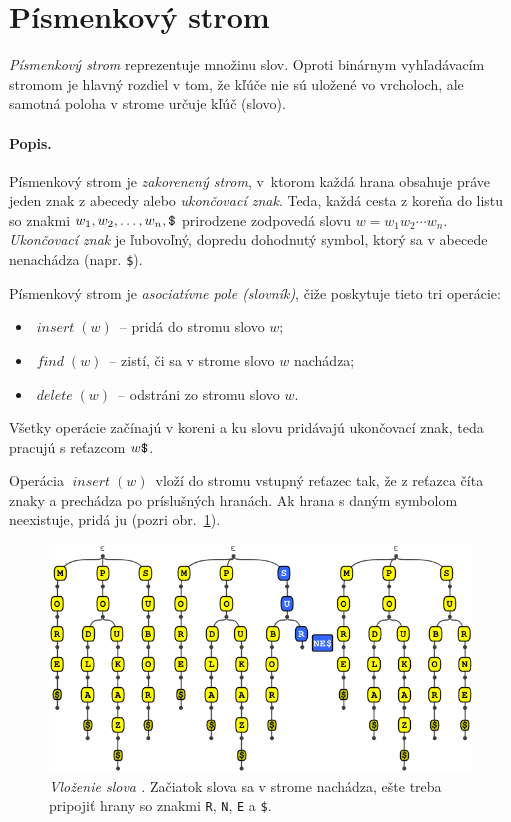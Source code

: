 
\def\k{w}
\def\put{$\mathop{\mathit{insert}}(\k)$}
\def\find{$\mathop{\mathit{find}}(\k)$}
\def\delete{$\mathop{\mathit{delete}}(\k)$}
\def\trie{trie}
\def\uz{\hbox{\tt\$}}

\section{Písmenkový strom}
\emph{Písmenkový strom} reprezentuje množinu slov. Oproti binárnym 
vyhľadávacím stromom je hlavný rozdiel v tom, že kľúče nie sú uložené 
vo vrcholoch, ale samotná poloha v strome určuje kľúč (slovo). 




\paragraph{Popis.}
Písmenkový strom je \emph{zakorenený strom}, v~ktorom každá hrana obsahuje 
práve jeden znak z abecedy alebo \emph{ukončovací znak}. Teda, každá cesta 
z koreňa do listu so znakmi $w_1, w_2, \ldots, w_n, \uz$ prirodzene 
zodpovedá slovu $w=w_1w_2\cdots w_n$. \emph{Ukončovací znak} je ľubovoľný, 
dopredu dohodnutý symbol, ktorý sa v abecede nenachádza (napr. \uz). 

Písmenkový strom je \emph{asociatívne pole (slovník)}, čiže 
poskytuje tieto tri operácie:
\begin{itemize}
\item \put\ -- pridá do stromu slovo $\k$;
\item \find\ -- zistí, či sa v strome slovo $\k$ nachádza;
\item \delete\ -- odstráni zo stromu slovo $\k$.
\end{itemize}
Všetky operácie začínajú v koreni a ku slovu pridávajú ukončovací znak, 
teda pracujú s reťazcom $\k\uz$. 

Operácia \put\ vloží do stromu vstupný reťazec tak, že z reťazca číta znaky 
a prechádza po príslušných hranách. Ak hrana s daným symbolom neexistuje, 
pridá ju (pozri obr.~\ref{img:trieinsert}).

\begin{figure}
\includegraphics[width=\columnwidth]{obrazky/trieinsertsmall.png}
\caption{\emph{Vloženie slova .} Začiatok slova 
 sa v strome nachádza, ešte treba pripojiť hrany 
so znakmi {\tt R}, {\tt N}, {\tt E} a \uz.} 
\label{img:trieinsert} 
\end{figure}

